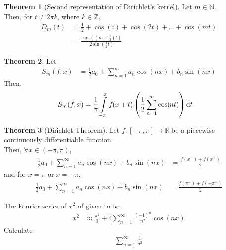 \documentclass[fleqn, a4paper, 12pt, twoside]{article}
\theoremstyle{definition}
\theoremstyle{theorem}
\newtheorem{theorem}{Theorem}
\begin{document}
\begin{theorem}[Second representation of Dirichlet's kernel]
	Let $m \in \mathbb{N}$.\\
	Then, for $t \neq 2 \pi k$, where $k \in \mathbb{Z}$,
	\begin{align*}
		D_m(t) & = \frac{1}{2} + \cos(t) + \cos(2 t) + \dots + \cos(m t) \\
                       & = \frac{\sin\left( \left( m + \frac{1}{2} \right) t \right)}{2 \sin\left( \frac{1}{2} t \right)}
	\end{align*}
\end{theorem}

\begin{theorem}
	Let
	\begin{align*}
		S_m(f,x) & = \frac{1}{2} a_0 + \sum\limits_{n = 1}^{m} a_n \cos(n x) + b_n \sin(n x)
	\end{align*}
	Then,
	\begin{align*}
		S_m(f,x) & = \frac{1}{\pi} \int\limits_{-\pi}^{\pi} f(x + t) \left( \frac{1}{2} \sum\limits_{n = 1}^{m} \cos(n t) \right) \dif t
	\end{align*}
\end{theorem}

\begin{theorem}[Dirichlet Theorem]
	Let $f : [-\pi,\pi] \to \mathbb{R}$ be a piecewise continuously differentiable function.\\
	Then, $\forall x \in (-\pi,\pi)$,
	\begin{align*}
		\frac{1}{2} a_0 + \sum\limits_{n = 1}^{\infty} a_n \cos(n x) + b_n \sin(n x) & = \frac{f(x^-) + f(x^+)}{2}
	\end{align*}
	and for $x = \pi$ or $x = -\pi$,
	\begin{align*}
		\frac{1}{2} a_0 + \sum\limits_{n = 1}^{\infty} a_n \cos(n x) + b_n \sin(n x) & = \frac{f(\pi^-) + f(-\pi^+)}{2}
	\end{align*}
	\label{Dirichlet_Theorem}
\end{theorem}

\begin{question}
	The Fourier series of $x^2$ of given to be
	\begin{align*}
		x^2 & \approx \frac{\pi^2}{3} + 4 \sum\limits_{n = 1}^{\infty} \frac{(-1)^n}{n^2} \cos(n x)
	\end{align*}
	Calculate
	\begin{align*}
		\sum\limits_{n = 1}^{\infty} \frac{1}{n^2}
	\end{align*}
\end{question}
\end{document}
